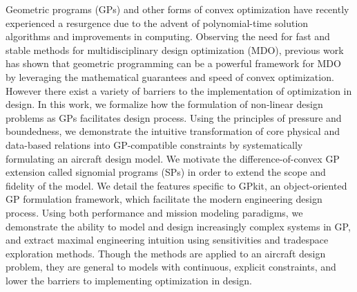 % 
% 
%


Geometric programs (GPs) and other forms of convex optimization have recently experienced
a resurgence due to the advent of polynomial-time solution algorithms and improvements in computing.
Observing the need for fast and stable methods for multidisciplinary
design optimization (MDO),
previous work has shown that geometric programming can be a powerful framework
for MDO by leveraging the mathematical guarantees
and speed of convex optimization. However there exist a variety of barriers to
the implementation of optimization in design.
In this work, we formalize how the formulation
of non-linear design problems as GPs facilitates design process.
Using the principles of pressure and boundedness,
we demonstrate the intuitive transformation of core physical and
data-based relations into GP-compatible constraints by systematically formulating an aircraft
design model. We motivate the difference-of-convex GP extension called signomial programs (SPs)
in order to extend the scope and fidelity of the model.
We detail the features specific to GPkit, an object-oriented GP formulation framework, which
facilitate the modern engineering design process.
Using both performance and mission modeling paradigms, we demonstrate the ability to
model and design increasingly complex systems in GP, and extract maximal engineering intuition
using sensitivities and tradespace exploration methods.
Though the methods are applied to an aircraft design problem, they are general to
models with continuous, explicit constraints, and lower the barriers to implementing
optimization in design.

